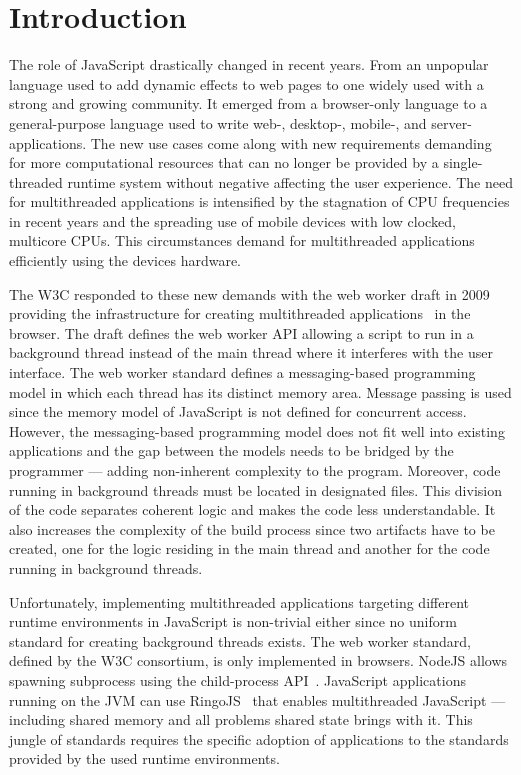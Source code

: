 \section{Introduction}\label{sec:introduction}
The role of JavaScript drastically changed in recent years. From an unpopular language used to add dynamic effects to web pages to one widely used with a strong and growing community. It emerged from a browser-only language to a general-purpose language used to write web-, desktop-, mobile-, and server-applications. The new use cases come along with new requirements demanding for more computational resources that can no longer be provided by a single-threaded runtime system without negative affecting the user experience. The need for multithreaded applications is intensified by the stagnation of CPU frequencies in recent years and the spreading use of mobile devices with low clocked, multicore CPUs. This circumstances demand for multithreaded applications efficiently using the devices hardware.

The W3C responded to these new demands with the web worker draft in 2009 providing the infrastructure for creating multithreaded applications~\cite{w3cWebWorker} in the browser. The draft defines the web worker API allowing a script to run in a background thread instead of the main thread where it interferes with the user interface. The web worker standard defines a messaging-based programming model in which each thread has its distinct memory area. Message passing is used since the memory model of JavaScript is not defined for concurrent access. However, the messaging-based programming model does not fit well into existing applications and the gap between the models needs to be bridged by the programmer --- adding non-inherent complexity to the program. Moreover, code running in background threads must be located in designated files. This division of the code separates coherent logic and makes the code less understandable. It also increases the complexity of the build process since two artifacts have to be created, one for the logic residing in the main thread and another for the code running in background threads. 

Unfortunately, implementing multithreaded applications targeting different runtime environments in JavaScript is non-trivial either since no uniform standard for creating background threads exists. The web worker standard, defined by the W3C consortium, is only implemented in browsers. NodeJS allows spawning subprocess using the child-process API~\cite{childProcess}. JavaScript applications running on the JVM can use RingoJS~\cite{RingoJS} that enables multithreaded JavaScript --- including shared memory and all problems shared state brings with it. This jungle of standards requires the specific adoption of applications to the standards provided by the used runtime environments.


